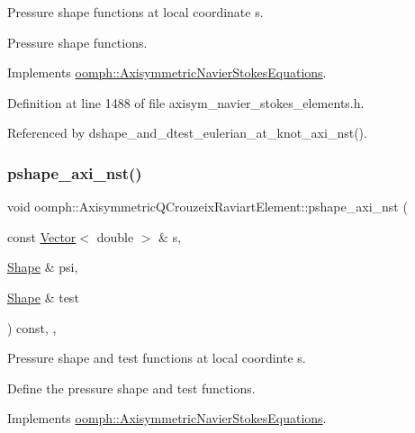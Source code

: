 Pressure shape functions at local coordinate s. 

Pressure shape functions. 

Implements \hyperlink{classoomph_1_1AxisymmetricNavierStokesEquations_a6309780fd1964c4df0cca0818ccff158}{oomph\+::\+Axisymmetric\+Navier\+Stokes\+Equations}.



Definition at line 1488 of file axisym\+\_\+navier\+\_\+stokes\+\_\+elements.\+h.



Referenced by dshape\+\_\+and\+\_\+dtest\+\_\+eulerian\+\_\+at\+\_\+knot\+\_\+axi\+\_\+nst().

\mbox{\label{classoomph_1_1AxisymmetricQCrouzeixRaviartElement_af131ceee4d1612696b66ce7ac3a866d1}} 
\subsubsection{\texorpdfstring{pshape\+\_\+axi\+\_\+nst()}{pshape\_axi\_nst()}\hspace{0.1cm}{\footnotesize\ttfamily [2/2]}}
{\footnotesize\ttfamily void oomph\+::\+Axisymmetric\+Q\+Crouzeix\+Raviart\+Element\+::pshape\+\_\+axi\+\_\+nst (\begin{DoxyParamCaption}\item[{const \hyperlink{classoomph_1_1Vector}{Vector}$<$ double $>$ \&}]{s,  }\item[{\hyperlink{classoomph_1_1Shape}{Shape} \&}]{psi,  }\item[{\hyperlink{classoomph_1_1Shape}{Shape} \&}]{test }\end{DoxyParamCaption}) const\hspace{0.3cm}{\ttfamily [inline]}, {\ttfamily [protected]}, {\ttfamily [virtual]}}



Pressure shape and test functions at local coordinte s. 

Define the pressure shape and test functions. 

Implements \hyperlink{classoomph_1_1AxisymmetricNavierStokesEquations_a19a4135581356bf368a7ecae2b315f85}{oomph\+::\+Axisymmetric\+Navier\+Stokes\+Equations}.




